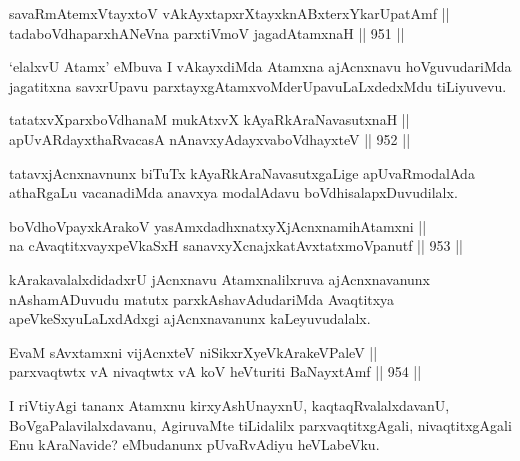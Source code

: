 \begin{shl}
savaRmAtemxVtayxtoV vAkAyxtapxrXtayxknABxterxYkarUpatAmf ||  \\
tadaboVdhaparxhANeVna parxtiVmoV jagadAtamxnaH ||  951 ||  
\end{shl}

\begin{artha}
`elalxvU Atamx' eMbuva I vAkayxdiMda Atamxna ajAcnxnavu hoVguvudariMda jagatitxna savxrUpavu parxtayxgAtamxvoMderUpavuLaLxdedxMdu tiLiyuvevu.
\end{artha}

\begin{shl}
tatatxvXparxboVdhanaM mukAtxvX kAyaRkAraNavasutxnaH || \\
apUvARdayxthaRvacasA nAnavxyAdayxvaboVdhayxteV ||  952 ||  
\end{shl}

\begin{artha}
tatavxjAcnxnavnunx biTuTx kAyaRkAraNavasutxgaLige apUvaRmodalAda athaRgaLu vacanadiMda anavxya modalAdavu boVdhisalapxDuvudilalx.
\end{artha}


\begin{shl}
boVdhoV\s payxkArakoV yasAmxdadhxnatxyXjAcnxnamihA\s \s tamxni || \\
na cA\s \s vaqtitxvayxpeVkaSxH sanavxyXcnajxkatAvxtatxmoVpanutf ||  953 ||  
\end{shl}

\begin{artha}
kArakavalalxdidadxrU jAcnxnavu Atamxnalilxruva ajAcnxnavanunx nAshamADuvudu matutx parxkAshavAdudariMda Avaqtitxya apeVkeSxyuLaLxdAdxgi ajAcnxnavanunx kaLeyuvudalalx.
\end{artha}


\begin{shl}
EvaM sAvxtamxni vijAcnxteV niSikxrXyeV\s kArakeV\s PaleV || \\
parxvaqtwtx vA nivaqtwtx vA koV heVturiti BaNayxtAmf ||  954 ||  
\end{shl}

\begin{artha}
I riVtiyAgi tananx Atamxnu kirxyAshUnayxnU, kaqtaqRvalalxdavanU, BoVgaPalavilalxdavanu, AgiruvaMte tiLidalilx parxvaqtitxgAgali, nivaqtitxgAgali Enu kAraNavide? eMbudanunx pUvaRvAdiyu heVLabeVku.
\end{artha}

